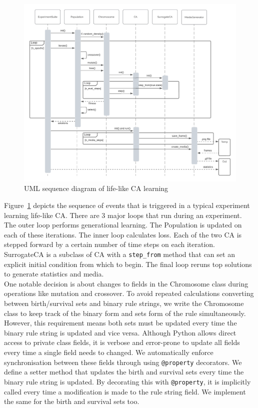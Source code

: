 \begin{figure}[!h]
\centering
    \includegraphics[width=\textwidth]{images/uml_seq.png}
    \caption{UML sequence diagram of life-like CA learning}
\label{fig:uml-seq}
\end{figure}

Figure~\ref{fig:uml-seq} depicts the sequence of events that is triggered in a typical experiment learning life-like CA. There are 3 major loops that run during an experiment. The outer loop performs generational learning. The Population is updated on each of these iterations. The inner loop calculates loss. Each of the two CA is stepped forward by a certain number of time steps on each iteration. SurrogateCA is a subclass of CA with a \texttt{step\_from} method that can set an explicit initial condition from which to begin. The final loop reruns top solutions to generate statistics and media.\\

One notable decision is about changes to fields in the Chromosome class during operations like mutation and crossover. To avoid repeated calculations converting between birth/survival sets and binary rule strings, we write the Chromosome class to keep track of the binary form and sets form of the rule simultaneously. However, this requirement means both sets must be updated every time the binary rule string is updated and vice versa. Although Python allows direct access to private class fields, it is verbose and error-prone to update all fields every time a single field needs to changed. We automatically enforce synchronisation between these fields through using \texttt{@property} decorators. We define a setter method that updates the birth and survival sets every time the binary rule string is updated. By decorating this with \texttt{@property}, it is implicitly called every time a modification is made to the rule string field. We implement the same for the birth and survival sets too.\\

